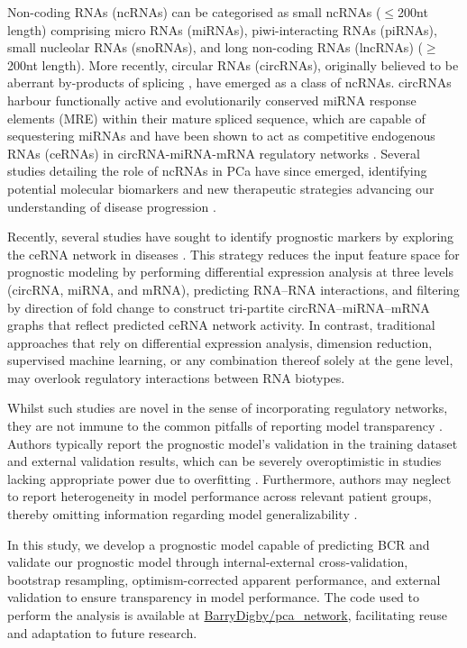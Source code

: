 Non-coding RNAs (ncRNAs) can be categorised as small ncRNAs ($\le$200nt length) comprising micro RNAs (miRNAs), piwi-interacting RNAs (piRNAs), small nucleolar RNAs (snoRNAs), and long non-coding RNAs (lncRNAs) ($\geq$200nt length). More recently, circular RNAs (circRNAs), originally believed to be aberrant by-products of splicing \cite{Cocquerelle1993Jan, Qian1992}, have emerged as a class of ncRNAs. circRNAs harbour functionally active and evolutionarily conserved miRNA response elements (MRE) within their mature spliced sequence, which are capable of sequestering miRNAs and have been shown to act as competitive endogenous RNAs (ceRNAs) in circRNA-miRNA-mRNA regulatory networks \cite{Thomas2014Aug, Hansen2013Mar, Denzler2014Jun}. Several studies detailing the role of ncRNAs in PCa have since emerged, identifying potential molecular biomarkers and new therapeutic strategies advancing our understanding of disease progression \cite{Aird2018, Bolton2014, Ghiam2017, Ding2021, Takayama2015}.

Recently, several studies have sought to identify prognostic markers by exploring the ceRNA network in diseases \cite{He2022Dec, Song2020Aug, Huang2023Oct, Zhang2023Dec, Guo2020Jul, Shang2025May}. This strategy reduces the input feature space for prognostic modeling by performing differential expression analysis at three levels (circRNA, miRNA, and mRNA), predicting RNA–RNA interactions, and filtering by direction of fold change to construct tri-partite circRNA–miRNA–mRNA graphs that reflect predicted ceRNA network activity. In contrast, traditional approaches that rely on differential expression analysis, dimension reduction, supervised machine learning, or any combination thereof solely at the gene level, may overlook regulatory interactions between RNA biotypes.

Whilst such studies are novel in the sense of incorporating regulatory networks, they are not immune to the common pitfalls of reporting model transparency \cite{Dhiman2021Oct}. Authors typically report the prognostic model's validation in the training dataset and external validation results, which can be severely overoptimistic in studies lacking appropriate power due to overfitting \cite{Steyerberg2015Apr}. Furthermore, authors may neglect to report heterogeneity in model performance across relevant patient groups, thereby omitting information regarding model generalizability \cite{Riley2016Jun}.

In this study, we develop a prognostic model capable of predicting BCR and validate our prognostic model through internal-external cross-validation, bootstrap resampling, optimism-corrected apparent performance, and external validation to ensure transparency in model performance. The code used to perform the analysis is available at \href{https://github.com/BarryDigby/pca_network}{BarryDigby/pca\_network}, facilitating reuse and adaptation to future research.


